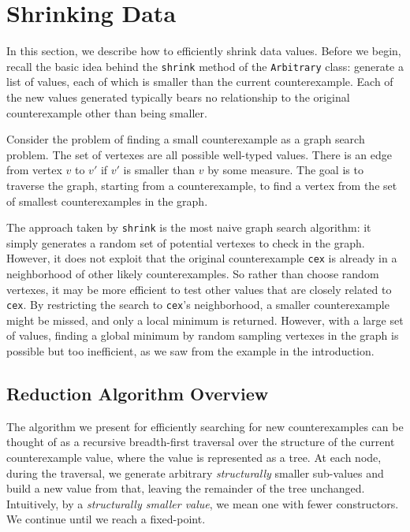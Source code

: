 \documentclass[10pt]{sigplanconf}
\newcommand{\ttp}[1]{\texttt{#1}}
\begin{document}
\section{Shrinking Data}\label{sec:shrinking}
In this section, we describe how to efficiently shrink data values.  Before we
begin, recall the basic idea behind the \ttp{shrink} method of the
\ttp{Arbitrary} class: generate a list of values, each of which is smaller than
the current counterexample.  Each of the new values generated typically bears no
relationship to the original counterexample other than being smaller.

Consider the problem of finding a small counterexample as a graph search
problem.  The set of vertexes are all possible well-typed values.  There is an
edge from vertex $v$ to $v'$ if $v'$ is smaller than $v$ by some measure.  The
goal is to traverse the graph, starting from a counterexample, to find a vertex
from the set of smallest counterexamples in the graph.

The approach taken by \ttp{shrink} is the most naive graph search algorithm: it
simply generates a random set of potential vertexes to check in the graph.
However, it does not exploit that the original counterexample \ttp{cex} is
already in a neighborhood of other likely counterexamples.  So rather than
choose random vertexes, it may be more efficient to test other values that are
closely related to \ttp{cex}.  By restricting the search to \ttp{cex}'s
neighborhood, a smaller counterexample might be missed, and only a local minimum
is returned.  However, with a large set of values, finding a global minimum by
random sampling vertexes in the graph is possible but too inefficient, as we saw
from the example in the introduction.

\subsection{Reduction Algorithm Overview}\label{sec:reduct}
The algorithm we present for efficiently searching for new counterexamples can
be thought of as a recursive breadth-first traversal over the structure of the
current counterexample value, where the value is represented as a tree.  At each
node, during the traversal, we generate arbitrary \emph{structurally} smaller
sub-values and build a new value from that, leaving the remainder of the tree
unchanged.  Intuitively, by a \emph{structurally smaller value}, we mean one
with fewer constructors.  We continue until we reach a fixed-point.
\end{document}

